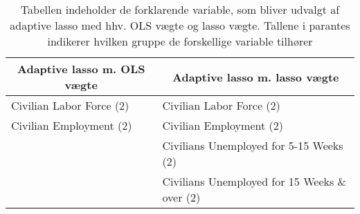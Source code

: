  \begin{table}
\small
\center
\begin{tabular}{l | l}
\toprule
\multicolumn{1}{c}{Adaptive lasso m. OLS vægte} &  \multicolumn{1}{c}{Adaptive lasso m. lasso vægte}  \\ \midrule
Civilian Labor Force  (2) & Civilian Labor Force (2) \\
Civilian Employment (2) &  Civilian Employment (2) \\
& Civilians Unemployed for 5-15 Weeks (2) \\
& Civilians Unemployed for 15 Weeks \& over (2) \\
 \bottomrule 
\end{tabular}
\caption{Tabellen indeholder de forklarende variable, som bliver udvalgt af adaptive lasso med hhv. OLS vægte og lasso vægte. Tallene i parantes indikerer hvilken gruppe de forskellige variable tilhører} \label{tab: v_ud}
\end{table}
